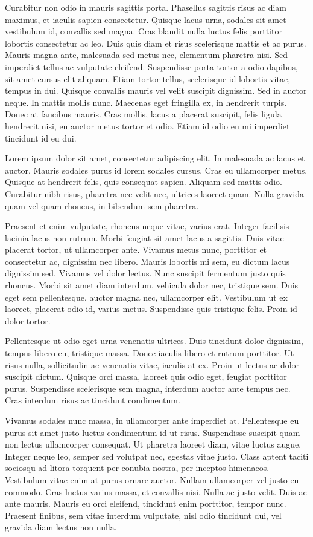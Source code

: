 \documentclass[10pt,
twocolumn,a4paper]{article}
\begin{document}
Curabitur non odio in mauris sagittis porta. Phasellus sagittis risus ac diam maximus, et iaculis sapien consectetur. Quisque lacus urna, sodales sit amet vestibulum id, convallis sed magna. Cras blandit nulla luctus felis porttitor lobortis consectetur ac leo. Duis quis diam et risus scelerisque mattis et ac purus. Mauris magna ante, malesuada sed metus nec, elementum pharetra nisi. Sed imperdiet tellus ac vulputate eleifend. Suspendisse porta tortor a odio dapibus, sit amet cursus elit aliquam. Etiam tortor tellus, scelerisque id lobortis vitae, tempus in dui. Quisque convallis mauris vel velit suscipit dignissim. Sed in auctor neque. In mattis mollis nunc. Maecenas eget fringilla ex, in hendrerit turpis. Donec at faucibus mauris. Cras mollis, lacus a placerat suscipit, felis ligula hendrerit nisi, eu auctor metus tortor et odio. Etiam id odio eu mi imperdiet tincidunt id eu dui. 



Lorem ipsum dolor sit amet, consectetur adipiscing elit. In malesuada ac lacus et auctor. Mauris sodales purus id lorem sodales cursus. Cras eu ullamcorper metus. Quisque at hendrerit felis, quis consequat sapien. Aliquam sed mattis odio. Curabitur nibh risus, pharetra nec velit nec, ultrices laoreet quam. Nulla gravida quam vel quam rhoncus, in bibendum sem pharetra.

Praesent et enim vulputate, rhoncus neque vitae, varius erat. Integer facilisis lacinia lacus non rutrum. Morbi feugiat sit amet lacus a sagittis. Duis vitae placerat tortor, ut ullamcorper ante. Vivamus metus nunc, porttitor et consectetur ac, dignissim nec libero. Mauris lobortis mi sem, eu dictum lacus dignissim sed. Vivamus vel dolor lectus. Nunc suscipit fermentum justo quis rhoncus. Morbi sit amet diam interdum, vehicula dolor nec, tristique sem. Duis eget sem pellentesque, auctor magna nec, ullamcorper elit. Vestibulum ut ex laoreet, placerat odio id, varius metus. Suspendisse quis tristique felis. Proin id dolor tortor.

Pellentesque ut odio eget urna venenatis ultrices. Duis tincidunt dolor dignissim, tempus libero eu, tristique massa. Donec iaculis libero et rutrum porttitor. Ut risus nulla, sollicitudin ac venenatis vitae, iaculis at ex. Proin ut lectus ac dolor suscipit dictum. Quisque orci massa, laoreet quis odio eget, feugiat porttitor purus. Suspendisse scelerisque sem magna, interdum auctor ante tempus nec. Cras interdum risus ac tincidunt condimentum.

Vivamus sodales nunc massa, in ullamcorper ante imperdiet at. Pellentesque eu purus sit amet justo luctus condimentum id ut risus. Suspendisse suscipit quam non lectus ullamcorper consequat. Ut pharetra laoreet diam, vitae luctus augue. Integer neque leo, semper sed volutpat nec, egestas vitae justo. Class aptent taciti sociosqu ad litora torquent per conubia nostra, per inceptos himenaeos. Vestibulum vitae enim at purus ornare auctor. Nullam ullamcorper vel justo eu commodo. Cras luctus varius massa, et convallis nisi. Nulla ac justo velit. Duis ac ante mauris. Mauris eu orci eleifend, tincidunt enim porttitor, tempor nunc. Praesent finibus, sem vitae interdum vulputate, nisl odio tincidunt dui, vel gravida diam lectus non nulla.
\end{document}
